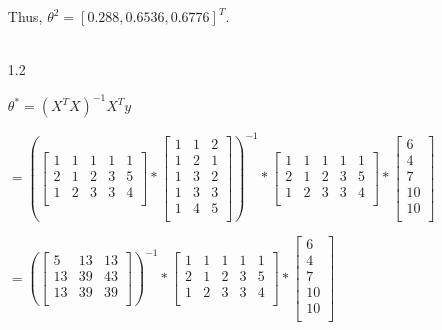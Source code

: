 \documentclass[12pt]{article}
\begin{document}
\begin{enumerate}
  Thus, $\theta^2 = [0.288, 0.6536, 0.6776]^T$. \\ \\

  \item[1.2]

  $\theta^* = (X^T X)^{-1} X^T y$

  $= (\begin{bmatrix}
    1 & 1 & 1 & 1 & 1 \\
    2 & 1 & 2 & 3 & 5 \\
    1 & 2 & 3 & 3 & 4 \\
    \end{bmatrix} *
    \begin{bmatrix}
      1 & 1 & 2 \\
      1 & 2 & 1 \\
      1 & 3 & 2 \\
      1 & 3 & 3 \\
      1 & 4 & 5 \\
    \end{bmatrix})^{-1} *
    \begin{bmatrix}
      1 & 1 & 1 & 1 & 1 \\
      2 & 1 & 2 & 3 & 5 \\
      1 & 2 & 3 & 3 & 4 \\
    \end{bmatrix} *
    \begin{bmatrix}
      6 \\
      4 \\
      7 \\
      10 \\
      10 \\
    \end{bmatrix}$

  $= (\begin{bmatrix}
    5 & 13 & 13 \\
    13 & 39 & 43 \\
    13 & 39 & 39 \\
    \end{bmatrix})^{-1} *
    \begin{bmatrix}
      1 & 1 & 1 & 1 & 1 \\
      2 & 1 & 2 & 3 & 5 \\
      1 & 2 & 3 & 3 & 4 \\
    \end{bmatrix} *
    \begin{bmatrix}
      6 \\
      4 \\
      7 \\
      10 \\
      10 \\
    \end{bmatrix}$


\end{enumerate}
\end{document}
